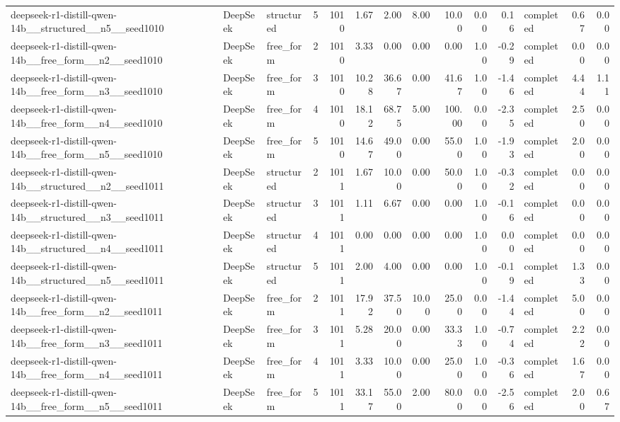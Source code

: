 \begin{longtable}{lllrrrrrrrrlrr}
deepseek-r1-distill-qwen-14b\_\_structured\_\_n5\_\_seed1010 & DeepSeek & structured & 5 & 1010 & 1.67 & 2.00 & 8.00 & 10.00 & 0.00 & 0.16 & completed & 0.67 & 0.00 \\
deepseek-r1-distill-qwen-14b\_\_free\_form\_\_n2\_\_seed1010 & DeepSeek & free\_form & 2 & 1010 & 3.33 & 0.00 & 0.00 & 0.00 & 1.00 & -0.29 & completed & 0.00 & 0.00 \\
deepseek-r1-distill-qwen-14b\_\_free\_form\_\_n3\_\_seed1010 & DeepSeek & free\_form & 3 & 1010 & 10.28 & 36.67 & 0.00 & 41.67 & 1.00 & -1.46 & completed & 4.44 & 1.11 \\
deepseek-r1-distill-qwen-14b\_\_free\_form\_\_n4\_\_seed1010 & DeepSeek & free\_form & 4 & 1010 & 18.12 & 68.75 & 5.00 & 100.00 & 0.00 & -2.35 & completed & 2.50 & 0.00 \\
deepseek-r1-distill-qwen-14b\_\_free\_form\_\_n5\_\_seed1010 & DeepSeek & free\_form & 5 & 1010 & 14.67 & 49.00 & 0.00 & 55.00 & 1.00 & -1.93 & completed & 2.00 & 0.00 \\
deepseek-r1-distill-qwen-14b\_\_structured\_\_n2\_\_seed1011 & DeepSeek & structured & 2 & 1011 & 1.67 & 10.00 & 0.00 & 50.00 & 1.00 & -0.32 & completed & 0.00 & 0.00 \\
deepseek-r1-distill-qwen-14b\_\_structured\_\_n3\_\_seed1011 & DeepSeek & structured & 3 & 1011 & 1.11 & 6.67 & 0.00 & 0.00 & 1.00 & -0.16 & completed & 0.00 & 0.00 \\
deepseek-r1-distill-qwen-14b\_\_structured\_\_n4\_\_seed1011 & DeepSeek & structured & 4 & 1011 & 0.00 & 0.00 & 0.00 & 0.00 & 1.00 & 0.00 & completed & 0.00 & 0.00 \\
deepseek-r1-distill-qwen-14b\_\_structured\_\_n5\_\_seed1011 & DeepSeek & structured & 5 & 1011 & 2.00 & 4.00 & 0.00 & 0.00 & 1.00 & -0.19 & completed & 1.33 & 0.00 \\
deepseek-r1-distill-qwen-14b\_\_free\_form\_\_n2\_\_seed1011 & DeepSeek & free\_form & 2 & 1011 & 17.92 & 37.50 & 10.00 & 25.00 & 0.00 & -1.44 & completed & 5.00 & 0.00 \\
deepseek-r1-distill-qwen-14b\_\_free\_form\_\_n3\_\_seed1011 & DeepSeek & free\_form & 3 & 1011 & 5.28 & 20.00 & 0.00 & 33.33 & 1.00 & -0.74 & completed & 2.22 & 0.00 \\
deepseek-r1-distill-qwen-14b\_\_free\_form\_\_n4\_\_seed1011 & DeepSeek & free\_form & 4 & 1011 & 3.33 & 10.00 & 0.00 & 25.00 & 1.00 & -0.36 & completed & 1.67 & 0.00 \\
deepseek-r1-distill-qwen-14b\_\_free\_form\_\_n5\_\_seed1011 & DeepSeek & free\_form & 5 & 1011 & 33.17 & 55.00 & 2.00 & 80.00 & 0.00 & -2.56 & completed & 2.00 & 0.67 \\

\end{longtable}
